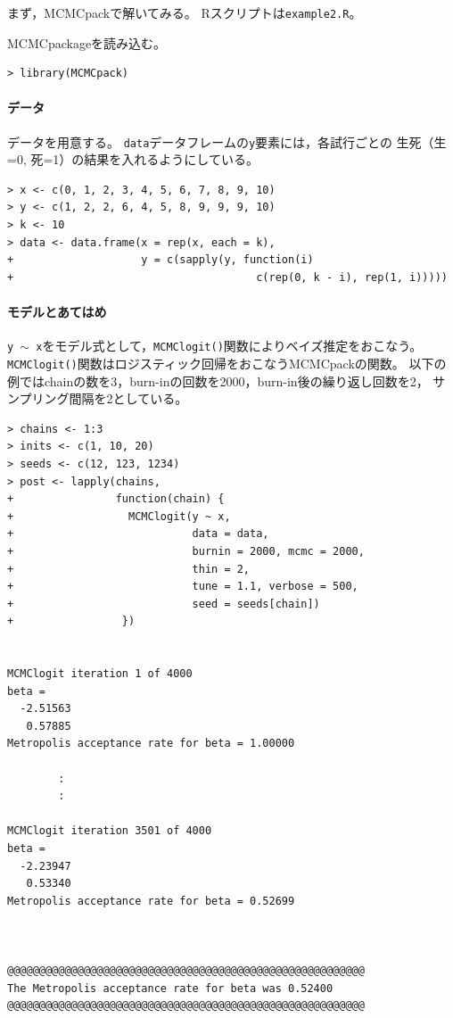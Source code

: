 \documentclass[11pt,uplatex]{jsarticle}
\begin{document}
まず，\textsf{MCMCpack}で解いてみる。
\textsf{R}スクリプトは\texttt{example2.R}。

\textsf{MCMCpackage}を読み込む。
\begin{lstlisting}
> library(MCMCpack)
\end{lstlisting}

\paragraph{データ}
データを用意する。
\texttt{data}データフレームの\texttt{y}要素には，各試行ごとの
生死（生=0, 死=1）の結果を入れるようにしている。
\begin{lstlisting}
> x <- c(0, 1, 2, 3, 4, 5, 6, 7, 8, 9, 10)
> y <- c(1, 2, 2, 6, 4, 5, 8, 9, 9, 9, 10)
> k <- 10
> data <- data.frame(x = rep(x, each = k),
+                    y = c(sapply(y, function(i)
+                                      c(rep(0, k - i), rep(1, i)))))
\end{lstlisting}

\paragraph{モデルとあてはめ}
\texttt{y $\sim$ x}をモデル式として，\texttt{MCMClogit()}関数によりベイズ推定をおこなう。
\texttt{MCMClogit()}関数はロジスティック回帰をおこなう\textsf{MCMCpack}の関数。
以下の例ではchainの数を3，burn-inの回数を2000，burn-in後の繰り返し回数を2，
サンプリング間隔を2としている。
\begin{lstlisting}
> chains <- 1:3
> inits <- c(1, 10, 20)
> seeds <- c(12, 123, 1234)
> post <- lapply(chains,
+                function(chain) {
+                  MCMClogit(y ~ x,
+                            data = data,
+                            burnin = 2000, mcmc = 2000,
+                            thin = 2,
+                            tune = 1.1, verbose = 500,
+                            seed = seeds[chain])
+                 })


MCMClogit iteration 1 of 4000 
beta = 
  -2.51563
   0.57885
Metropolis acceptance rate for beta = 1.00000

        :
        :
        
MCMClogit iteration 3501 of 4000 
beta = 
  -2.23947
   0.53340
Metropolis acceptance rate for beta = 0.52699



@@@@@@@@@@@@@@@@@@@@@@@@@@@@@@@@@@@@@@@@@@@@@@@@@@@@@@@@
The Metropolis acceptance rate for beta was 0.52400
@@@@@@@@@@@@@@@@@@@@@@@@@@@@@@@@@@@@@@@@@@@@@@@@@@@@@@@@
\end{lstlisting}
\end{document}
